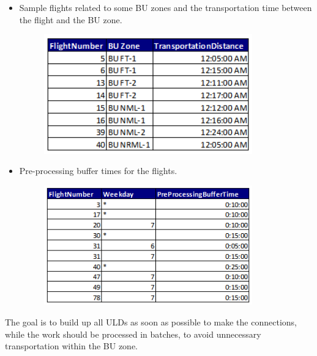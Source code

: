 \documentclass[11pt,a4paper,fleqn]{article}
\begin{document}
\begin{itemize}

	\item Sample flights related to some BU zones and the transportation time between the flight and the BU zone.
	
	\begin{figure}[hbt!]
		\centering
		\includegraphics[width=90mm,scale=1.5]{sample_bu_flight.png}
	\end{figure}

\end{itemize}

\begin{itemize}

	\item Pre-processing buffer times for the flights.
	
	\begin{figure}[hbt!]
		\centering
		\includegraphics[width=90mm,scale=1.5]{preprocess_time.png}
	\end{figure}
	
\end{itemize}

The goal is to build up all ULDs as soon as possible to make the connections, while the work should be processed in batches, to avoid unnecessary transportation within the BU zone.

\newpage
\end{document}
